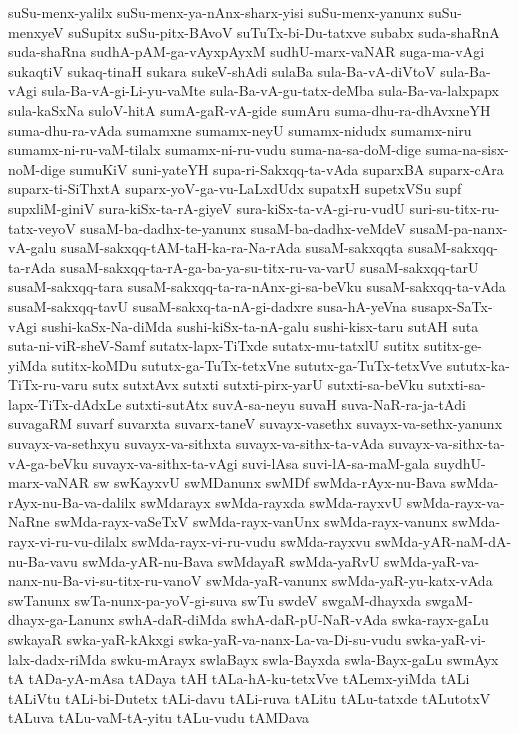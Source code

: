 {suSu-menx-yalilx
suSu-menx-ya-nAnx-sharx-yisi
suSu-menx-yanunx
suSu-menxyeV
suSupitx
suSu-pitx-BAvoV
suTuTx-bi-Du-tatxve
subabx
suda-shaRnA
suda-shaRna
sudhA-pAM-ga-vAyxpAyxM
sudhU-marx-vaNAR
suga-ma-vAgi
sukaqtiV
sukaq-tinaH
sukara
sukeV-shAdi
sulaBa
sula-Ba-vA-diVtoV
sula-Ba-vAgi
sula-Ba-vA-gi-Li-yu-vaMte
sula-Ba-vA-gu-tatx-deMba
sula-Ba-va-lalxpapx
sula-kaSxNa
suloV-hitA
sumA-gaR-vA-gide
sumAru
suma-dhu-ra-dhAvxneYH
suma-dhu-ra-vAda
sumamxne
sumamx-neyU
sumamx-nidudx
sumamx-niru
sumamx-ni-ru-vaM-tilalx
sumamx-ni-ru-vudu
suma-na-sa-doM-dige
suma-na-sisx-noM-dige
sumuKiV
suni-yateYH
supa-ri-Sakxqq-ta-vAda
suparxBA
suparx-cAra
suparx-ti-SiThxtA
suparx-yoV-ga-vu-LaLxdUdx
supatxH
supetxVSu
supf
supxliM-giniV
sura-kiSx-ta-rA-giyeV
sura-kiSx-ta-vA-gi-ru-vudU
suri-su-titx-ru-tatx-veyoV
susaM-ba-dadhx-te-yanunx
susaM-ba-dadhx-veMdeV
susaM-pa-nanx-vA-galu
susaM-sakxqq-tAM-taH-ka-ra-Na-rAda
susaM-sakxqqta
susaM-sakxqq-ta-rAda
susaM-sakxqq-ta-rA-ga-ba-ya-su-titx-ru-va-varU
susaM-sakxqq-tarU
susaM-sakxqq-tara
susaM-sakxqq-ta-ra-nAnx-gi-sa-beVku
susaM-sakxqq-ta-vAda
susaM-sakxqq-tavU
susaM-sakxq-ta-nA-gi-dadxre
susa-hA-yeVna
susapx-SaTx-vAgi
sushi-kaSx-Na-diMda
sushi-kiSx-ta-nA-galu
sushi-kisx-taru
sutAH
suta
suta-ni-viR-sheV-Samf
sutatx-lapx-TiTxde
sutatx-mu-tatxlU
sutitx
sutitx-ge-yiMda
sutitx-koMDu
sututx-ga-TuTx-tetxVne
sututx-ga-TuTx-tetxVve
sututx-ka-TiTx-ru-varu
sutx
sutxtAvx
sutxti
sutxti-pirx-yarU
sutxti-sa-beVku
sutxti-sa-lapx-TiTx-dAdxLe
sutxti-sutAtx
suvA-sa-neyu
suvaH
suva-NaR-ra-ja-tAdi
suvagaRM
suvarf
suvarxta
suvarx-taneV
suvayx-vasethx
suvayx-va-sethx-yanunx
suvayx-va-sethxyu
suvayx-va-sithxta
suvayx-va-sithx-ta-vAda
suvayx-va-sithx-ta-vA-ga-beVku
suvayx-va-sithx-ta-vAgi
suvi-lAsa
suvi-lA-sa-maM-gala
suydhU-marx-vaNAR
sw
swKayxvU
swMDanunx
swMDf
swMda-rAyx-nu-Bava
swMda-rAyx-nu-Ba-va-dalilx
swMdarayx
swMda-rayxda
swMda-rayxvU
swMda-rayx-va-NaRne
swMda-rayx-vaSeTxV
swMda-rayx-vanUnx
swMda-rayx-vanunx
swMda-rayx-vi-ru-vu-dilalx
swMda-rayx-vi-ru-vudu
swMda-rayxvu
swMda-yAR-naM-dA-nu-Ba-vavu
swMda-yAR-nu-Bava
swMdayaR
swMda-yaRvU
swMda-yaR-va-nanx-nu-Ba-vi-su-titx-ru-vanoV
swMda-yaR-vanunx
swMda-yaR-yu-katx-vAda
swTanunx
swTa-nunx-pa-yoV-gi-suva
swTu
swdeV
swgaM-dhayxda
swgaM-dhayx-ga-Lanunx
swhA-daR-diMda
swhA-daR-pU-NaR-vAda
swka-rayx-gaLu
swkayaR
swka-yaR-kAkxgi
swka-yaR-va-nanx-La-va-Di-su-vudu
swka-yaR-vi-lalx-dadx-riMda
swku-mArayx
swlaBayx
swla-Bayxda
swla-Bayx-gaLu
swmAyx
tA
tADa-yA-mAsa
tADaya
tAH
tALa-hA-ku-tetxVve
tALemx-yiMda
tALi
tALiVtu
tALi-bi-Dutetx
tALi-davu
tALi-ruva
tALitu
tALu-tatxde
tALutotxV
tALuva
tALu-vaM-tA-yitu
tALu-vudu
tAMDava
}
